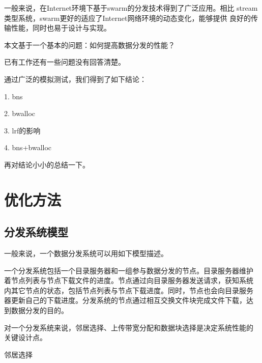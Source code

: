 一般来说，在Internet环境下基于swarm的分发技术得到了广泛应用。相比
stream类型系统，swarm更好的适应了Internet网络环境的动态变化，能够提供
良好的传输性能，同时也易于设计与实现。

本文基于一个基本的问题：如何提高数据分发的性能？


已有工作还有一些问题没有回答清楚。

通过广泛的模拟测试，我们得到了如下结论：

1. bns

2. bwalloc

3. lrf的影响

4. bns+bwalloc

再对结论小小的总结一下。


\section{优化方法}

% 

\subsection{分发系统模型}

一般来说，一个数据分发系统可以用如下模型描述。

一个分发系统包括一个目录服务器和一组参与数据分发的节点。目录服务器维护
着节点列表与节点下载文件的进度。节点通过向目录服务器发送请求，获知系统
内其它节点的状态，包括节点列表与节点下载进度。同时，节点也会向目录服务
器更新自己的下载进度。分发系统的节点通过相互交换文件块完成文件下载，达
到数据分发的目的。


对一个分发系统来说，邻居选择、上传带宽分配和数据块选择是决定系统性能的
关键设计点。

邻居选择

% 



